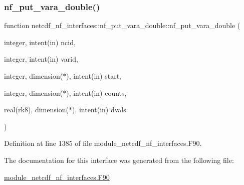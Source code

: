 \subsubsection{\texorpdfstring{nf\+\_\+put\+\_\+vara\+\_\+double()}{nf\_put\_vara\_double()}}
{\footnotesize\ttfamily function netcdf\+\_\+nf\+\_\+interfaces\+::nf\+\_\+put\+\_\+vara\+\_\+double\+::nf\+\_\+put\+\_\+vara\+\_\+double (\begin{DoxyParamCaption}\item[{integer, intent(in)}]{ncid,  }\item[{integer, intent(in)}]{varid,  }\item[{integer, dimension($\ast$), intent(in)}]{start,  }\item[{integer, dimension($\ast$), intent(in)}]{counts,  }\item[{real(rk8), dimension($\ast$), intent(in)}]{dvals }\end{DoxyParamCaption})}



Definition at line 1385 of file module\+\_\+netcdf\+\_\+nf\+\_\+interfaces.\+F90.



The documentation for this interface was generated from the following file\+:\begin{DoxyCompactItemize}
\item 
\hyperlink{module__netcdf__nf__interfaces_8F90}{module\+\_\+netcdf\+\_\+nf\+\_\+interfaces.\+F90}\end{DoxyCompactItemize}
